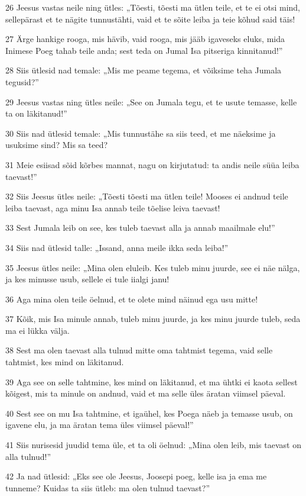\par 26 Jeesus vastas neile ning ütles: „Tõesti, tõesti ma ütlen teile, et te ei otsi mind, sellepärast et te nägite tunnustähti, vaid et te sõite leiba ja teie kõhud said täis!
\par 27 Ärge hankige rooga, mis hävib, vaid rooga, mis jääb igaveseks eluks, mida Inimese Poeg tahab teile anda; sest teda on Jumal Isa pitseriga kinnitanud!”
\par 28 Siis ütlesid nad temale: „Mis me peame tegema, et võiksime teha Jumala tegusid?”
\par 29 Jeesus vastas ning ütles neile: „See on Jumala tegu, et te usute temasse, kelle ta on läkitanud!”
\par 30 Siis nad ütlesid temale: „Mis tunnustähe sa siis teed, et me näeksime ja usuksime sind? Mis sa teed?
\par 31 Meie esiisad sõid kõrbes mannat, nagu on kirjutatud: ta andis neile süüa leiba taevast!”
\par 32 Siis Jeesus ütles neile: „Tõesti tõesti ma ütlen teile! Mooses ei andnud teile leiba taevast, aga minu Isa annab teile tõelise leiva taevast!
\par 33 Sest Jumala leib on see, kes tuleb taevast alla ja annab maailmale elu!”
\par 34 Siis nad ütlesid talle: „Issand, anna meile ikka seda leiba!”
\par 35 Jeesus ütles neile: „Mina olen eluleib. Kes tuleb minu juurde, see ei näe nälga, ja kes minusse usub, sellele ei tule iialgi janu!
\par 36 Aga mina olen teile öelnud, et te olete mind näinud ega usu mitte!
\par 37 Kõik, mis Isa minule annab, tuleb minu juurde, ja kes minu juurde tuleb, seda ma ei lükka välja.
\par 38 Sest ma olen taevast alla tulnud mitte oma tahtmist tegema, vaid selle tahtmist, kes mind on läkitanud.
\par 39 Aga see on selle tahtmine, kes mind on läkitanud, et ma ühtki ei kaota sellest kõigest, mis ta minule on andnud, vaid et ma selle üles äratan viimsel päeval.
\par 40 Sest see on mu Isa tahtmine, et igaühel, kes Poega näeb ja temasse usub, on igavene elu, ja ma äratan tema üles viimsel päeval!”
\par 41 Siis nurisesid juudid tema üle, et ta oli öelnud: „Mina olen leib, mis taevast on alla tulnud!”
\par 42 Ja nad ütlesid: „Eks see ole Jeesus, Joosepi poeg, kelle isa ja ema me tunneme? Kuidas ta siis ütleb: ma olen tulnud taevast?”
